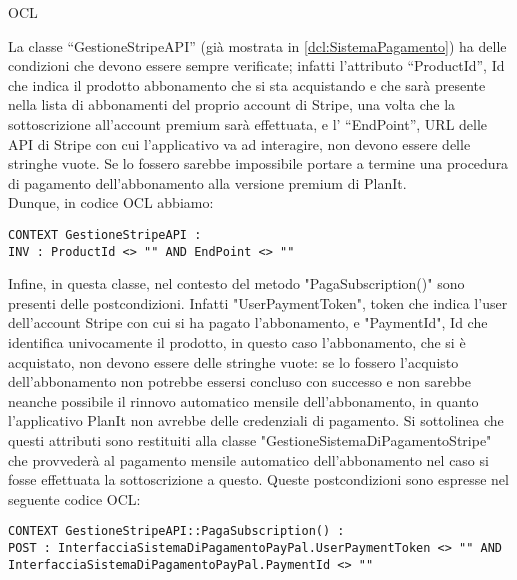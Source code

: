 \begin{listaPersonale}{OCL}
    \begin{center}
        
    \end{center}
    La classe “GestioneStripeAPI” (già mostrata in \ref{dcl:SistemaPagamento}) ha delle condizioni che devono essere sempre verificate; infatti l’attributo “ProductId”, Id che indica il prodotto abbonamento che si sta acquistando e che sarà presente nella lista di abbonamenti del proprio account di Stripe, una volta che la sottoscrizione all’account premium sarà effettuata, e l’ “EndPoint”, URL delle API di Stripe con cui l’applicativo va ad interagire, non devono essere delle stringhe vuote. Se lo fossero sarebbe impossibile portare a termine una procedura di pagamento dell'abbonamento alla versione premium di PlanIt. \\
    Dunque, in codice OCL abbiamo:
    \begin{lstlisting}
CONTEXT GestioneStripeAPI :
INV : ProductId <> "" AND EndPoint <> ""
    \end{lstlisting}
    Infine, in questa classe, nel contesto del metodo "PagaSubscription()" sono presenti delle postcondizioni. Infatti "UserPaymentToken", token che indica l'user dell'account Stripe con cui si ha pagato l'abbonamento, e "PaymentId", Id che identifica univocamente il prodotto, in questo caso l'abbonamento, che si è acquistato, non devono essere delle stringhe vuote: se lo fossero l'acquisto dell'abbonamento non potrebbe essersi concluso con successo e non sarebbe neanche possibile il rinnovo automatico mensile dell'abbonamento, in quanto l'applicativo PlanIt non avrebbe delle credenziali di pagamento. Si sottolinea che questi attributi sono restituiti alla classe "GestioneSistemaDiPagamentoStripe" che provvederà al pagamento mensile automatico dell'abbonamento nel caso si fosse effettuata la sottoscrizione a questo.
    Queste postcondizioni sono espresse nel seguente codice OCL:
    \begin{lstlisting}
CONTEXT GestioneStripeAPI::PagaSubscription() :
POST : InterfacciaSistemaDiPagamentoPayPal.UserPaymentToken <> "" AND InterfacciaSistemaDiPagamentoPayPal.PaymentId <> ""
    \end{lstlisting}





\end{listaPersonale}

